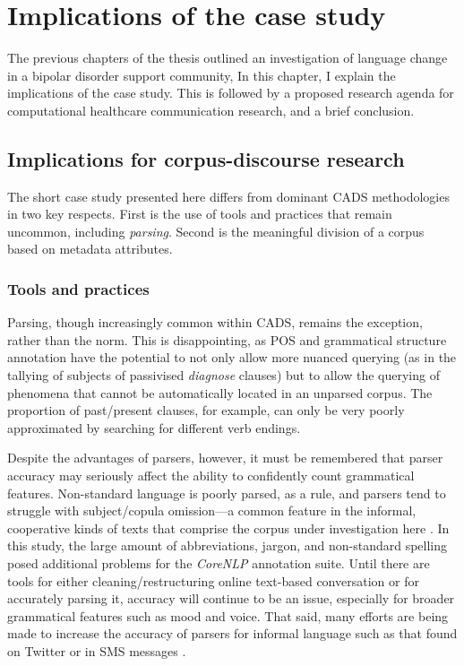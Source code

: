 

\chapter{Implications of the case study}

The previous chapters of the thesis outlined an investigation of language change in a bipolar disorder support community, In this chapter, I explain the implications of the case study. This is followed by a proposed research agenda for computational healthcare communication research, and a brief conclusion.

\section{Implications for corpus-discourse research} \lipsum

The short case study presented here differs from dominant \gls{CADS} methodologies in two key respects. First is the use of tools and practices that remain uncommon, including \emph{parsing}. Second is the meaningful division of a \gls{corpus} based on metadata attributes.

\subsection{Tools and practices} \lipsum

Parsing, though increasingly common within \gls{CADS}, remains the exception, rather than the norm. This is disappointing, as \gls{POS} and grammatical structure annotation have the potential to not only allow more nuanced querying (as in the tallying of subjects of passivised \emph{diagnose} clauses) but to allow the querying of phenomena that cannot be automatically located in an unparsed corpus. The proportion of past/present clauses, for example, can only be very poorly approximated by searching for different verb endings.

Despite the advantages of parsers, however, it must be remembered that parser accuracy may seriously affect the ability to confidently count grammatical features. Non-standard language is poorly parsed, as a rule, and parsers tend to struggle with subject/copula omission---a common feature in the informal, cooperative kinds of texts that comprise the corpus under investigation here \cite{matthiessen_lexicogrammatical_1995}. In this study, the large amount of abbreviations, jargon, and non-standard spelling posed additional problems for the \emph{CoreNLP} annotation suite. Until there are tools for either cleaning/restructuring online text-based conversation or for accurately parsing it, accuracy will continue to be an issue, especially for broader grammatical features such as mood and voice. That said, many efforts are being made to increase the accuracy of parsers for informal language such as that found on Twitter or in SMS messages \cite{gimpel_part--speech_2011}.

